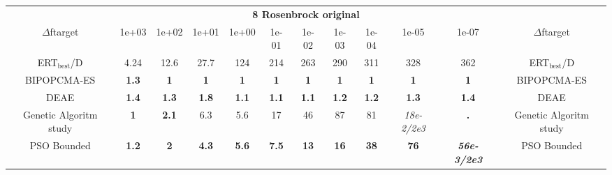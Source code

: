 \begin{tabular}{cccccccccccc}
 & \multicolumn{10}{c}{{\normalsize \textbf{8 Rosenbrock original}}}\\
$\Delta$ftarget& 1e+03& 1e+02& 1e+01& 1e+00& 1e-01& 1e-02& 1e-03& 1e-04& 1e-05& 1e-07 & $\Delta$ftarget \\
ERT$_{\textrm{best}}$/D& 4.24& 12.6& 27.7& 124& 214& 263& 290& 311& 328& 362 & ERT$_{\textrm{best}}$/D \\
\hline
BIPOPCMA-ES & \textbf{1.3} & \textbf{1} & \textbf{1} & \textbf{1} & \textbf{1} & \textbf{1} & \textbf{1} & \textbf{1} & \textbf{1} & \textbf{1} & BIPOPCMA-ES \cite{add_an_entry_for_BIPOPCMA-ES_in_bbob.bib}\\
DEAE & \textbf{1.4} & \textbf{1.3} & \textbf{1.8} & \textbf{1.1} & \textbf{1.1} & \textbf{1.1} & \textbf{1.2} & \textbf{1.2} & \textbf{1.3} & \textbf{1.4} & DEAE \cite{add_an_entry_for_DEAE_in_bbob.bib}\\
Genetic Algoritm study & \textbf{1} & \textbf{2.1} & 6.3 & 5.6 & 17 & 46 & 87 & 81 & \textit{18e-2}\textit{/2e3} & \textbf{.} & Genetic Algoritm study \cite{add_an_entry_for_Genetic Algoritm study_in_bbob.bib}\\
PSO Bounded & \textbf{1.2} & \textbf{2} & \textbf{4.3} & \textbf{5.6} & \textbf{7.5} & \textbf{13} & \textbf{16} & \textbf{38} & \textbf{76} & \textbf{\textit{56e-3}\textit{/2e3}} & PSO Bounded \cite{add_an_entry_for_PSO Bounded_in_bbob.bib}
\end{tabular}
